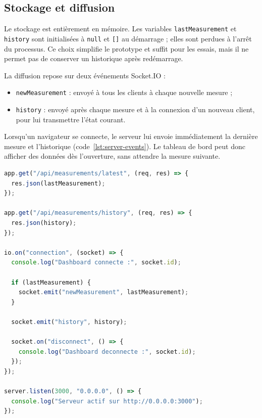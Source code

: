 \documentclass[11pt,a4paper]{article}
\begin{document}
\subsection{Stockage et diffusion}

Le stockage est entièrement en mémoire. Les variables \texttt{lastMeasurement} et
\texttt{history} sont initialisées à \texttt{null} et \texttt{[]} au démarrage ; elles sont
perdues à l'arrêt du processus. Ce choix simplifie le prototype et suffit pour les essais,
mais il ne permet pas de conserver un historique après redémarrage.

La diffusion repose sur deux événements Socket.IO :

\begin{itemize}
  \item \texttt{newMeasurement} : envoyé à tous les clients à chaque nouvelle mesure ;
  \item \texttt{history} : envoyé après chaque mesure et à la connexion d'un nouveau client,
        pour lui transmettre l'état courant.
\end{itemize}

Lorsqu'un navigateur se connecte, le serveur lui envoie immédiatement la dernière mesure et
l'historique (code~\ref{lst:server-events}). Le tableau de bord peut donc afficher des données
dès l'ouverture, sans attendre la mesure suivante.

\begin{lstlisting}[language=JavaScript,firstnumber=114,
  caption={Lecture de l'état courant et gestion des connexions Socket.IO (\texttt{nodeserver/server.js}).},
  label={lst:server-events}]
app.get("/api/measurements/latest", (req, res) => {
  res.json(lastMeasurement);
});

app.get("/api/measurements/history", (req, res) => {
  res.json(history);
});

io.on("connection", (socket) => {
  console.log("Dashboard connecte :", socket.id);

  if (lastMeasurement) {
    socket.emit("newMeasurement", lastMeasurement);
  }

  socket.emit("history", history);

  socket.on("disconnect", () => {
    console.log("Dashboard deconnecte :", socket.id);
  });
});

server.listen(3000, "0.0.0.0", () => {
  console.log("Serveur actif sur http://0.0.0.0:3000");
});
\end{lstlisting}

\end{document}
